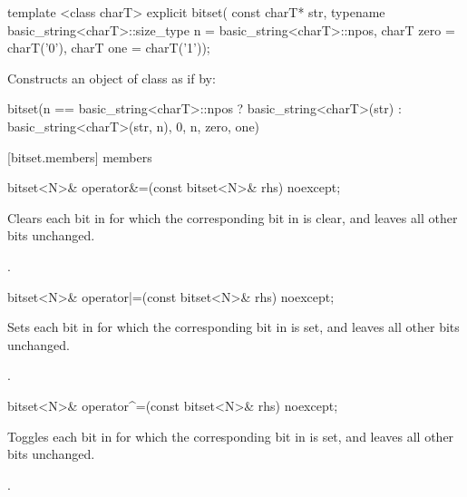 %
\begin{itemdecl}
template <class charT>
  explicit bitset(
    const charT* str,
    typename basic_string<charT>::size_type n = basic_string<charT>::npos,
    charT zero = charT('0'),
    charT one = charT('1'));
\end{itemdecl}

\begin{itemdescr}
\pnum
\effects Constructs an object of class  as if by:
\begin{codeblock}
bitset(n == basic_string<charT>::npos
          ? basic_string<charT>(str)
          : basic_string<charT>(str, n),
       0, n, zero, one)
\end{codeblock}
\end{itemdescr}


[bitset.members]{ members}

%
\begin{itemdecl}
bitset<N>& operator&=(const bitset<N>& rhs) noexcept;
\end{itemdecl}

\begin{itemdescr}
\pnum
\effects
Clears each bit in
for which the corresponding bit in  is clear, and leaves all other bits unchanged.

\pnum
\returns
{}.
\end{itemdescr}

%
\begin{itemdecl}
bitset<N>& operator|=(const bitset<N>& rhs) noexcept;
\end{itemdecl}

\begin{itemdescr}
\pnum
\effects
Sets each bit in
for which the corresponding bit in  is set, and leaves all other bits unchanged.

\pnum
\returns
{}.
\end{itemdescr}

%
\begin{itemdecl}
bitset<N>& operator^=(const bitset<N>& rhs) noexcept;
\end{itemdecl}

\begin{itemdescr}
\pnum
\effects
Toggles each bit in
for which the corresponding bit in  is set, and leaves all other bits unchanged.

\pnum
\returns
{}.
\end{itemdescr}


